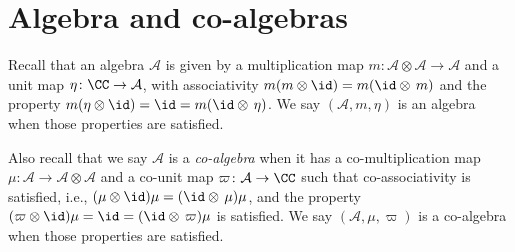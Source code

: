 
\chapter{Algebra and co-algebras}

 Recall that an algebra $\mathcal{A}$ is given by a multiplication map $m\colon \mathcal{A}\otimes\mathcal{A}\to\mathcal{A}$ and a unit map $\eta\colon \CC\to\mathcal{A}$, with associativity $m(m\otimes\id)=m(\id\otimes\,m)$ and the property $m(\eta\otimes\id)=\id=m(\id\otimes\,\eta)$. We say $(\mathcal{A},m,\eta)$ is an algebra when those properties are satisfied.

 Also recall that we say $\mathcal{A}$ is a \textit{co-algebra} when it has a co-multiplication map $\mu\colon\mathcal{A}\to\mathcal{A}\otimes\mathcal{A}$ and a co-unit map $\varpi\colon\mathcal{A}\to\CC$ such that co-associativity is satisfied, i.e., $(\mu\otimes\id)\mu=(\id\otimes\,\mu)\mu$, and the property $(\varpi\otimes\id)\mu=\id=(\id\otimes\,\varpi)\mu$ is satisfied.
 We say $(\mathcal{A},\mu,\varpi)$ is a co-algebra when those properties are satisfied.

